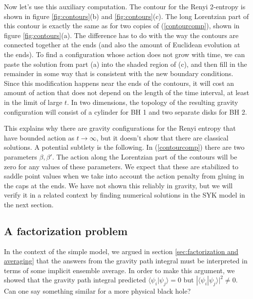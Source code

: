 \documentclass[12pt]{article}
\numberwithin{equation}{section}
\begin{document}
Now let's use this auxiliary computation. The contour for the Renyi 2-entropy is shown in figure \ref{fig:contours}(b) and \ref{fig:contours}(c). The long Lorentzian part of this contour is exactly the same as for two copies of (\ref{contourcomp}), shown in figure \ref{fig:contours}(a). The difference has to do with the way the contours are connected together at the ends (and also the amount of Euclidean evolution at the ends). To find a configuration whose action does not grow with time, we can paste the solution from part (a) into the shaded region of (c), and then fill in the remainder in some way that is consistent with the new boundary conditions. Since this modification happens near the ends of the contours, it will cost an amount of action that does not depend on the length of the time interval, at least in the limit of large $t$. In two dimensions, the topology of the resulting gravity configuration will consist of a cylinder for BH 1 and two separate disks for BH 2.

This explains why there are gravity configurations for the Renyi entropy that have bounded action as $t\rightarrow \infty$, but it doesn't show that there are classical solutions. A potential subtlety is the following. In (\ref{contourcomp}) there are two parameters $\beta,\beta'$. The action along the Lorentzian part of the contours will be zero for any values of these parameters. We expect that these are stabilized to saddle point values when we take into account the action penalty from gluing in the caps at the ends. We have not shown this reliably in gravity, but we will verify it in a related context by finding numerical solutions in the SYK model in the next section.


\subsection{A factorization problem}\label{sec:factorizationProblem}
In the context of the simple model, we argued in section \ref{sec:factorization and averaging} that the answers from the gravity path integral must be interpreted in terms of some implicit ensemble average. In order to make this argument, we showed that the gravity path integral predicted $\langle \psi_i|\psi_j\rangle = 0$ but $|\langle \psi_i|\psi_j\rangle|^2 \neq 0$. Can one say something similar for a more physical black hole?
\end{document}
